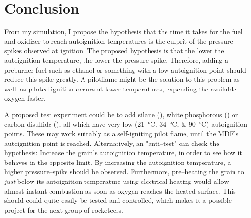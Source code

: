 \chapter{Conclusion}

From my simulation, I propose the hypothesis that the time it takes for the fuel and oxidizer to reach autoignition temperatures is the culprit of the pressure spikes observed at ignition. The proposed hypothesis is that the lower the autoignition temperature, the lower the pressure spike. Therefore, adding a preburner fuel such as ethanol or something with a low autoignition point should reduce this spike greatly. A pilotflame might be the solution to this problem as well, as piloted ignition occurs at lower temperatures, expending the available oxygen faster.

A proposed test experiment could be to add silane (), white phosphorous () or carbon disulfide (), all which have very low (\SIlist{21;34;90}{\celsius}) autoignition points. These may work suitably as a self-igniting pilot flame, until the MDF's autoignition point is reached.
Alternatively, an "anti--test" can check the hypothesis: Increase the grain's autoignition temperature, in order to see how it behaves in the opposite limit. By increasing the autoignition temperature, a higher pressure--spike should be observed. Furthermore, pre--heating the grain to \emph{just} below its autoignition temperature using electrical heating would allow almost instant combustion as soon as oxygen reaches the heated surface. This should could quite easily be tested and controlled, which makes it a possible project for the next group of rocketeers.
